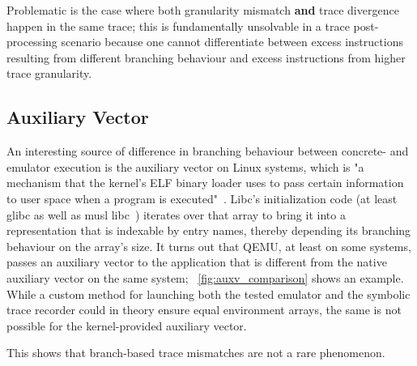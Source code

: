 Problematic is the case where both granularity mismatch \textbf{and} trace divergence happen in the same trace; this is
fundamentally unsolvable in a trace post-processing scenario because one cannot differentiate between excess
instructions resulting from different branching behaviour and excess instructions from higher trace granularity.

\subsection{Auxiliary Vector}\label{sec:auxv}

An interesting source of difference in branching behaviour between concrete- and emulator execution is the auxiliary
vector on Linux systems, which is "a mechanism that the kernel's ELF binary loader uses to pass certain information to
user space when a program is executed"~\cite{getauxval2024Mar}. Libc's initialization code (at least glibc as well as
musl libc~\cite{MuslLibc2024Feb}) iterates over that array to bring it into a representation that is indexable by entry
names, thereby depending its branching behaviour on the array's size. It turns out that QEMU, at least on some systems,
passes an auxiliary vector to the application that is different from the native auxiliary vector on the same system;
\figurename~\ref{fig:auxv_comparison} shows an example. While a custom method for launching both the tested emulator and
the symbolic trace recorder could in theory ensure equal environment arrays, the same is not possible for the
kernel-provided auxiliary vector.

This shows that branch-based trace mismatches are not a rare phenomenon.

